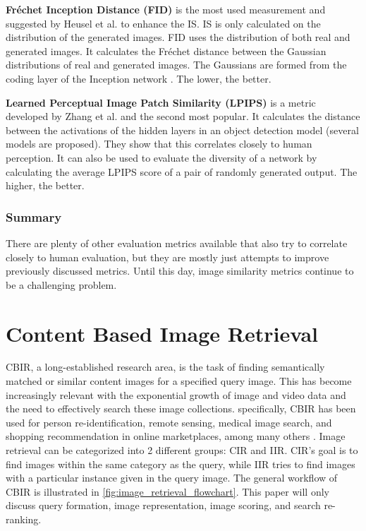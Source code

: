 \textbf{Fréchet Inception Distance (FID)} is the most used measurement and suggested by Heusel et al. \cite{Heusel2017} to enhance the \gls{IS}.
\gls{IS} is only calculated on the distribution of the generated images.
\gls{FID} uses the distribution of both real and generated images.
It calculates the Fréchet distance \cite{Frechet1957} between the Gaussian distributions of real and generated images.
The Gaussians are formed from the coding layer of the Inception network \cite{Szegedy2015}.
The lower, the better.

\textbf{Learned Perceptual Image Patch Similarity (LPIPS)} is a metric developed by Zhang et al. \cite{Zhang2018} and the second most popular.
It calculates the distance between the activations of the hidden layers in an object detection model (several models are proposed).
They show that this correlates closely to human perception.
It can also be used to evaluate the diversity of a network by calculating the average \gls{LPIPS} score of a pair of randomly generated output.
The higher, the better.

\subsubsection{Summary}
There are plenty of other evaluation metrics available that also try to correlate closely to human evaluation, but they are mostly just attempts to improve previously discussed metrics.
Until this day, image similarity metrics continue to be a challenging problem.

\section{Content Based Image Retrieval}
\gls{CBIR}, a long-established research area, is the task of finding semantically matched or similar content images for a specified query image.
This has become increasingly relevant with the exponential growth of image and video data and the need to effectively search these image collections.
specifically, \gls{CBIR} has been used for person re-identification, remote sensing, medical image search, and shopping recommendation in online marketplaces, among many others \cite{Chen2021}.
Image retrieval can be categorized into 2 different groups: \gls{CIR} and \gls{IIR}.
\gls{CIR}'s goal is to find images within the same category as the query, while \gls{IIR} tries to find images with a particular instance given in the query image.
The general workflow of \gls{CBIR} is illustrated in \ref{fig:image_retrieval_flowchart}.
This paper will only discuss query formation, image representation, image scoring, and search re-ranking.

